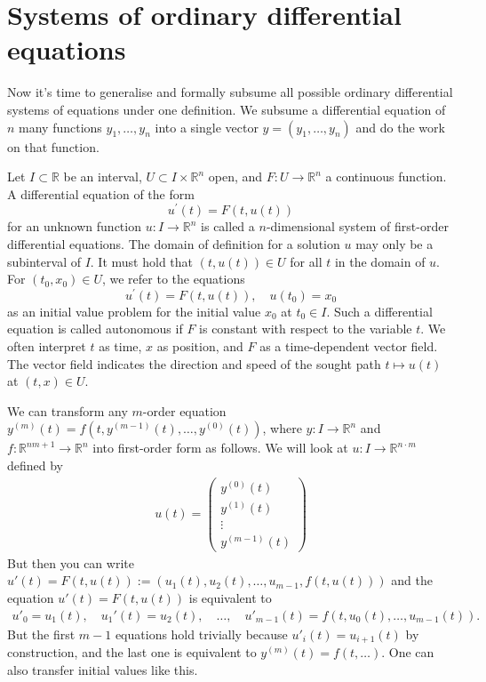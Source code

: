 \section{Systems of ordinary differential equations}

Now it's time to generalise and formally subsume all possible ordinary differential systems of equations under one definition. We subsume a differential equation of $n$ many functions $y_{1}, \dots, y_{n}$ into a single vector $y = (y_{1}, \dots, y_{n})$ and do the work on that function.

\begin{definition}\label{def:n-sys-de}
	Let $I \subset \mathbb{R}$ be an interval, $U \subset I \times \mathbb{R}^n$ open, and $F: U \rightarrow \mathbb{R}^n$ a continuous function. A differential equation of the form
	$$
		u^{\prime}(t)=F(t, u(t))
	$$
	for an unknown function $u: I \to \mathbb{R}^{n}$ is called a $n$-dimensional system of first-order differential equations. The domain of definition for a solution $u$ may only be a subinterval of $I$. It must hold that $(t, u(t)) \in U$ for all $t$ in the domain of $u$. For $\left(t_0, x_0\right) \in U$, we refer to the equations
	$$
		u^{\prime}(t)=F(t, u(t)), \quad u\left(t_0\right)=x_0
	$$
	as an initial value problem for the initial value $x_0$ at $t_0 \in I$. Such a differential equation is called autonomous if $F$ is constant with respect to the variable $t$. We often interpret $t$ as time, $x$ as position, and $F$ as a time-dependent vector field. The vector field indicates the direction and speed of the sought path $t \mapsto u(t)$ at $(t, x) \in U$.
\end{definition}

\begin{remark}\label{rem:first-order-enough}
	We can transform any $m$-order equation $y^{(m)}(t) = f(t, y^{(m-1)}(t), \dots, y^{(0)}(t))$, where $y: I \to \mathbb{R}^{n}$ and $f: \mathbb{R}^{nm+1} \to \mathbb{R}^{n}$ into first-order form as follows. We will look at $u: I \to \mathbb{R}^{n \cdot m}$ defined by
	\begin{align*}
		u(t) =
		\begin{pmatrix}
			y^{(0)}(t) \\
			y^{(1)}(t) \\
			\vdots     \\
			y^{(m-1)}(t)
		\end{pmatrix}
	\end{align*}
	But then you can write $u'(t) = F(t, u(t)) := (u_{1}(t), u_{2}(t), \dots, u_{m-1}, f(t, u(t)))$ and the equation $u'(t) = F(t, u(t))$ is equivalent to
	\begin{align*}
		u'_{0} = u_{1}(t), \quad u_{1}'(t) = u_{2}(t), \quad \dots, \quad u'_{m-1}(t) = f(t, u_{0}(t), \dots, u_{m-1}(t)).
	\end{align*}
	But the first $m-1$ equations hold trivially because $u'_{i}(t) = u_{i+1}(t)$ by construction, and the last one is equivalent to $y^{(m)}(t) = f(t, \dots)$.
	One can also transfer initial values like this.
\end{remark}

